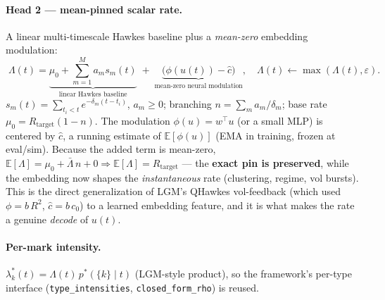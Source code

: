 \documentclass[11pt]{article}
\newcommand{\Lam}{\Lambda}
\begin{document}
\paragraph{Head 2 --- mean-pinned scalar rate.} A linear multi-timescale Hawkes baseline plus a
\emph{mean-zero} embedding modulation:
\[
\boxed{\;\Lam(t)=\underbrace{\mu_0+\sum_{m=1}^{M}a_m s_m(t)}_{\text{linear Hawkes baseline}}
\;+\;\underbrace{\bigl(\phi(u(t))-\hat c\bigr)}_{\text{mean-zero neural modulation}},\quad
\Lam(t)\leftarrow\max(\Lam(t),\varepsilon).\;}
\]
$s_m(t)=\sum_{t_i<t}e^{-\delta_m(t-t_i)}$, $a_m\ge0$; branching $n=\sum_m a_m/\delta_m$; base rate
$\mu_0=R_{\mathrm{target}}(1-n)$. The modulation $\phi(u)=w^\top u$ (or a small MLP) is centered by
$\hat c$, a running estimate of $\mathbb{E}[\phi(u)]$ (EMA in training, frozen at eval/sim). Because
the added term is mean-zero, $\mathbb{E}[\Lam]=\mu_0+\bar\Lam\,n+0\Rightarrow
\mathbb{E}[\Lam]=R_{\mathrm{target}}$ --- the \textbf{exact pin is preserved}, while the embedding now
shapes the \emph{instantaneous} rate (clustering, regime, vol bursts). This is the direct
generalization of LGM's QHawkes vol-feedback (which used $\phi=b\,R^2$, $\hat c=b\,c_0$) to a learned
embedding feature, and it is what makes the rate a genuine \emph{decode} of $u(t)$.
\paragraph{Per-mark intensity.} $\lambda_k^*(t)=\Lam(t)\,p^*(\{k\}\mid t)$ (LGM-style product), so the
framework's per-type interface (\texttt{type\_intensities}, \texttt{closed\_form\_rho}) is reused.
\end{document}
